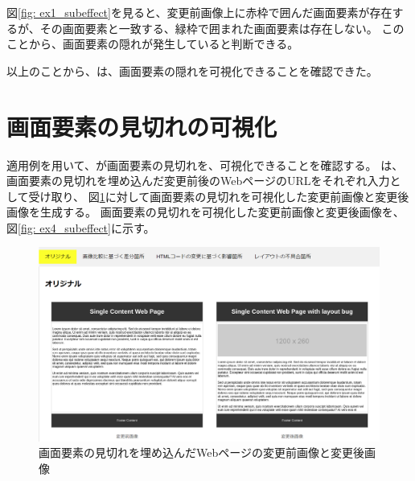 \par
図\ref{fig: ex1_subeffect}を見ると、変更前画像上に赤枠で囲んだ画面要素が存在するが、その画面要素と一致する、緑枠で囲まれた画面要素は存在しない。
このことから、画面要素の隠れが発生していると判断できる。
\par
以上のことから、\toolName は、画面要素の隠れを可視化できることを確認できた。

\section{画面要素の見切れの可視化}\label{sec:result_area_detec}
適用例を用いて、\toolName が画面要素の見切れを、可視化できることを確認する。
\toolName は、画面要素の見切れを埋め込んだ変更前後のWebページのURLをそれぞれ入力として受け取り、
図\ref{fig: ex4_original}に対して画面要素の見切れを可視化した変更前画像と変更後画像を生成する。
画面要素の見切れを可視化した変更前画像と変更後画像を、図\ref{fig: ex4_subeffect}に示す。
\begin{figure}[tp]
    \begin{center}
        \includegraphics[width=1.0\columnwidth]{image/5/ex4_original.png}
        \caption{画面要素の見切れを埋め込んだWebページの変更前画像と変更後画像}
        \label{fig: ex4_original}
    \end{center}
\end{figure}

